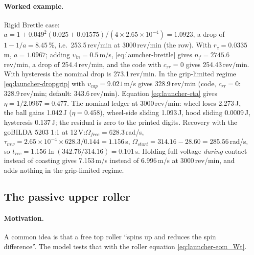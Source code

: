 \paragraph{Worked example.} Rigid Brettle case: $a = 1 + 0.049^2(0.025 + 0.01575)/(4\times2.65\times10^{-4}) =
1.0923$\derived, a drop of $1 - 1/a = 8.45$\,\%\derived{}, i.e.\ 253.5\,\unit{rev/min}\derived{} at
3000\,\unit{rev/min}\assumed{} (the  row). With $r_c = 0.0335$\,\unit{m}\derived,
$a = 1.0967$\derived; adding $v_{in} = 0.5$\,\unit{m/s}\assumed, \eqref{eq:launcher-brettle} gives
$n_f = 2745.6$\,\unit{rev/min}\derived{}, a drop of 254.4\,\unit{rev/min}\derived, and the code with
$c_{rr} = 0$ gives 254.43\,\unit{rev/min}\predicted. With hysteresis the nominal drop is
273.1\,\unit{rev/min}\predicted. In the grip-limited regime \eqref{eq:launcher-dropgrip} with
$v_{cap} = 9.021$\,\unit{m/s}\predicted{} gives 328.9\,\unit{rev/min}\derived{} (code, $c_{rr}=0$:
328.9\,\unit{rev/min}\predicted; default: 343.6\,\unit{rev/min}\predicted).
Equation \eqref{eq:launcher-eta} gives $\eta = 1/2.0967 = 0.477$\derived. The nominal ledger at
3000\,\unit{rev/min}: wheel loses 2.273\,\unit{J}\predicted, the ball gains 1.042\,\unit{J}\predicted{}
($\eta = 0.458$\predicted), wheel-side sliding 1.093\,\unit{J}\predicted, hood sliding
0.0009\,\unit{J}\predicted, hysteresis 0.137\,\unit{J}\predicted; the residual is zero to the printed digits.
Recovery with the goBILDA 5203 1:1\confirmed{} at 12\,\unit{V}\confirmed:$\Omega_{free} = 628.3$\,\unit{rad/s}\derived,
$\tau_{mw} = 2.65\times10^{-4}\times628.3/0.144 = 1.156$\,\unit{s}\derived,
$\Omega_{start} = 314.16 - 28.60 = 285.56$\,\unit{rad/s}\derived, so
$t_{rec} = 1.156\ln(342.76/314.16) = 0.101$\,\unit{s}\derived. Holding full voltage \emph{during} contact
instead of coasting gives 7.153\,\unit{m/s}\predicted{} instead of 6.996\,\unit{m/s}\predicted{} at
3000\,\unit{rev/min}\assumed, and adds nothing in the grip-limited regime.

\subsection{The passive upper roller}
\label{sec:launcher:roller}

\paragraph{Motivation.} A common idea is that a free top roller ``spins up and reduces the spin
difference''. The model tests that with the roller equation \eqref{eq:launcher-eom_Wt}.


